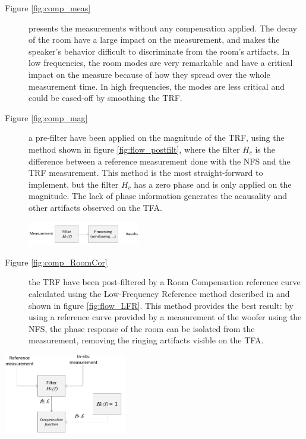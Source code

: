 \documentclass{report}
\begin{document}
\begin{description}
\item[Figure \ref{fig:comp_meas}] presents the measurements without any compensation applied. The decay of the room have a large impact on the measurement, and makes the speaker's behavior difficult to discriminate from the room's artifacts. In low frequencies, the room modes are very remarkable and have a critical impact on the measure because of how they spread over the whole measurement time. In high frequencies, the modes are less critical and could be eased-off by smoothing the TRF.

\item[Figure \ref{fig:comp_mag}] a pre-filter have been applied on the magnitude of the TRF, using the method shown in figure \ref{fig:flow_postfilt}, where the filter $H_{c}$ is the difference between a reference measurement done with the NFS and the TRF measurement. This method is the most straight-forward to implement, but the filter $H_{c}$ has a zero phase and is only applied on the magnitude. The lack of phase information generates the acausality and other artifacts observed on the TFA.

\begin{center}
	\includegraphics[width=0.4\textwidth]{RoomComp/flowchart_prefilter} 
    \captionsetup{hypcap=false} 
	\label{fig:flow_postfilt}
\end{center}

\item[Figure \ref{fig:comp_RoomCor}] the TRF have been post-filtered by a Room Compensation reference curve calculated using the Low-Frequency Reference method described in \citep[][sect.~4]{aeswb} and shown in figure \ref{fig:flow_LFR}. This method provides the best result: by using a reference curve provided by a measurement of the woofer using the NFS, the phase response of the room can be isolated from the measurement, removing the ringing artifacts visible on the TFA. 
\end{description}

\begin{center}
	\includegraphics[width=0.4\textwidth]{RoomComp/flowchart_LFR} 
    \captionsetup{hypcap=false} 
	\label{fig:flow_LFR}
\end{center}
\end{document}
